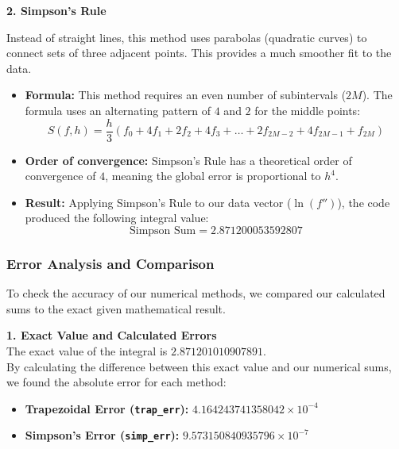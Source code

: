 \vspace{5pt}
\noindent\textbf{2. Simpson's Rule} \cite[page 257]{Sauer2014}

Instead of straight lines, this method uses parabolas (quadratic curves) to connect sets of three adjacent points. This provides a much smoother fit to the data.

\begin{itemize}    
    \item \textbf{Formula:} This method requires an even number of subintervals ($2M$). The formula uses an alternating pattern of $4$ and $2$ for the middle points:
    \begin{equation}
        S(f, h) = \frac{h}{3}(f_0 + 4f_1 + 2f_2 + 4f_3 + \dots + 2f_{2M-2} + 4f_{2M-1} + f_{2M})
    \end{equation}
    
    \item \textbf{Order of convergence:} Simpson's Rule has a theoretical order of convergence of $4$, meaning the global error is proportional to $h^4$.
    
    \item \textbf{Result:} Applying Simpson's Rule to our data vector ($\ln(f'')$), the code produced the following integral value:
    \begin{equation*}
        \text{Simpson Sum} = 2.871200053592807
    \end{equation*}
\end{itemize}

\vspace{10pt}
\subsubsection{Error Analysis and Comparison}

To check the accuracy of our numerical methods, we compared our calculated sums to the exact given mathematical result.

\vspace{5pt}
\noindent\textbf{1. Exact Value and Calculated Errors} \\
The exact value of the integral is $2.871201010907891$. \\
By calculating the difference between this exact value and our numerical sums, we found the absolute error for each method:
\begin{itemize}
    \item \textbf{Trapezoidal Error (\texttt{trap\_err}):} $4.164243741358042 \times 10^{-4}$
    \item \textbf{Simpson's Error (\texttt{simp\_err}):} $9.573150840935796 \times 10^{-7}$
\end{itemize}

